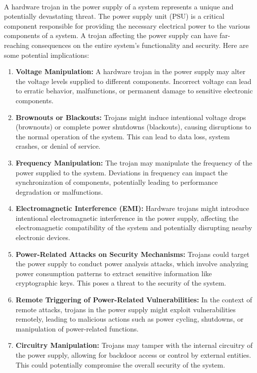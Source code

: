 \paragraph*{}
A hardware trojan in the power supply of a system represents a unique and potentially devastating threat. The power supply unit (PSU) is a critical component responsible for providing the necessary electrical power to the various components of a system. A trojan affecting the power supply can have far-reaching consequences on the entire system's functionality and security. Here are some potential implications:
\begin{enumerate}
	\item \textbf{Voltage Manipulation:} A hardware trojan in the power supply may alter the voltage levels supplied to different components. Incorrect voltage can lead to erratic behavior, malfunctions, or permanent damage to sensitive electronic components.
	\item \textbf{Brownouts or Blackouts:} Trojans might induce intentional voltage drops (brownouts) or complete power shutdowns (blackouts), causing disruptions to the normal operation of the system. This can lead to data loss, system crashes, or denial of service.
	\item \textbf{Frequency Manipulation:} The trojan may manipulate the frequency of the power supplied to the system. Deviations in frequency can impact the synchronization of components, potentially leading to performance degradation or malfunctions.
	\item \textbf{Electromagnetic Interference (EMI):} Hardware trojans might introduce intentional electromagnetic interference in the power supply, affecting the electromagnetic compatibility of the system and potentially disrupting nearby electronic devices.
	\item \textbf{Power-Related Attacks on Security Mechanisms:} Trojans could target the power supply to conduct power analysis attacks, which involve analyzing power consumption patterns to extract sensitive information like cryptographic keys. This poses a threat to the security of the system.
	\item \textbf{Remote Triggering of Power-Related Vulnerabilities:} In the context of remote attacks, trojans in the power supply might exploit vulnerabilities remotely, leading to malicious actions such as power cycling, shutdowns, or manipulation of power-related functions.
	\item\textbf{ Circuitry Manipulation:} Trojans may tamper with the internal circuitry of the power supply, allowing for backdoor access or control by external entities. This could potentially compromise the overall security of the system.
\end{enumerate}
